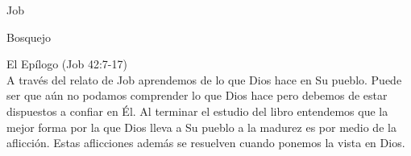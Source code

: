 \begin{section}{Job}
\begin{subsection}{Bosquejo}
\begin{subsubsection}{El Epílogo (Job 42:7-17)}
	\\
	A través del relato de Job aprendemos de lo que Dios hace en Su pueblo.
	\newpage
	Puede ser que aún no podamos comprender lo que Dios hace pero debemos de estar dispuestos a confiar en Él. Al terminar el estudio del libro entendemos que la mejor forma por la que Dios lleva a Su pueblo a la madurez es por medio de la aflicción. Estas aflicciones además se resuelven cuando ponemos la vista en Dios.
\end{subsubsection}
\end{subsection}
\end{section}
%


